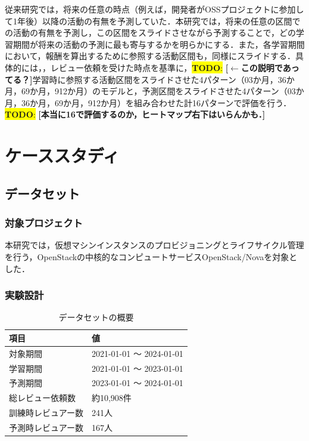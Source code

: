 \documentclass[submit,techrep,noauthor]{ipsj}
\newcommand{\todo}[1]{\colorbox{yellow}{{\bf TODO}:}{\color{red} {\textbf{[#1]}}}}
\begin{document}
従来研究では，将来の任意の時点（例えば，開発者がOSSプロジェクトに参加して1年後）以降の活動の有無を予測していた．本研究では，将来の任意の区間での活動の有無を予測し，この区間をスライドさせながら予測することで，どの学習期間が将来の活動の予測に最も寄与するかを明らかにする．また，各学習期間において，報酬を算出するために参照する活動区間も，同様にスライドする．具体的には，，レビュー依頼を受けた時点を基準に，\todo{$\leftarrow$この説明であってる？}学習時に参照する活動区間をスライドさせた4パターン（03か月，36か月，69か月，912か月）のモデルと，予測区間をスライドさせた4パターン（03か月，36か月，69か月，912か月）を組み合わせた計16パターンで評価を行う．\todo{本当に16で評価するのか，ヒートマップ右下はいらんかも．}

\section{ケーススタディ}
\label{sec:casestudy}

\subsection{データセット}
\subsubsection{対象プロジェクト}
本研究では，仮想マシンインスタンスのプロビジョニングとライフサイクル管理を行う，OpenStackの中核的なコンピュートサービスOpenStack/Novaを対象とした．
\subsubsection{実験設計}
\begin{table}[h]
    \centering
    \caption{データセットの概要}
    \begin{tabularx}{\columnwidth}{XX}
        \hline
        項目 & 値 \\
        \hline
        対象期間 & 2021-01-01 ～ 2024-01-01 \\
        学習期間 & 2021-01-01 ～ 2023-01-01 \\
        予測期間 & 2023-01-01 ～ 2024-01-01 \\
        \hline
        総レビュー依頼数 & 約10,908件 \\
        訓練時レビュアー数 & 241人 \\
        予測時レビュアー数 & 167人 \\
        \hline
    \end{tabularx}
    \label{table:dataset}
\end{table}
\end{document}
